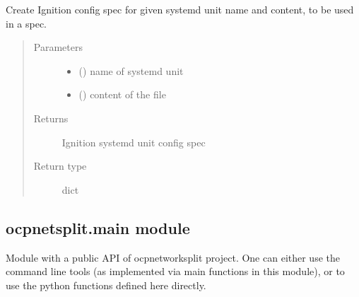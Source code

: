 \documentclass[letterpaper,10pt,english]{sphinxmanual}
\begin{document}
\begin{fulllineitems}
\label{\detokenize{ocpnetsplit:ocpnetsplit.machineconfig.create_unit_dict}}
Create Ignition config spec for given systemd unit name and content, to be
used in a  spec.
\begin{quote}\begin{description}
\item[{Parameters}] \leavevmode\begin{itemize}
\item {} 
 () \textendash{} name of systemd unit

\item {} 
 () \textendash{} content of the file

\end{itemize}

\item[{Returns}] \leavevmode
Ignition systemd unit config spec

\item[{Return type}] \leavevmode
dict

\end{description}\end{quote}

\end{fulllineitems}



\subsection{ocpnetsplit.main module}
\label{\detokenize{ocpnetsplit:module-ocpnetsplit.main}}\label{\detokenize{ocpnetsplit:ocpnetsplit-main-module}}
Module with a public API of ocp\sphinxhyphen{}network\sphinxhyphen{}split project. One can either use the
command line tools (as implemented via main functions in this module), or to
use the python functions defined here directly.
\end{document}
